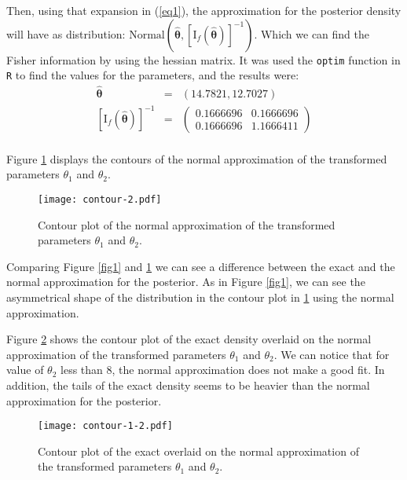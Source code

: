 \documentclass[a4paper, 11pt]{article}
\begin{document}
Then, using that expansion in (\ref{eq1}), the approximation for the posterior density will have as distribution: $\mbox{Normal} \left(\boldsymbol{\hat{\theta}}, [\mbox{I}_f(\boldsymbol{\hat{\theta}})]^{-1}  \right)$. Which we can find the Fisher information by using the hessian matrix. It was used the \texttt{optim} function in \texttt{R} to find the values for the parameters, and the results were: 
\begin{equation}
\begin{array}{rclll}
\boldsymbol{\hat{\theta}} & = & (14.7821, 12.7027) \\
\left[\mbox{I}_f(\boldsymbol{\hat{\theta}})\right]^{-1} & = & \left(
    \begin{array}{cc}
     0.1666696  & 0.1666696\\
     0.1666696  & 1.1666411 
    \end{array}
        \right) \\
\end{array}
\label{eq2}
\end{equation}

Figure \ref{fig2} displays the contours of the normal approximation of the transformed parameters $\theta_1$ and $\theta_2$. 
\begin{figure}[H]
\centering
\caption{Contour plot of the normal approximation of the transformed parameters $\theta_1$ and $\theta_2$.}
\label{fig2}
\texttt{[image: contour-2.pdf]}
\end{figure}

Comparing Figure \ref{fig1} and \ref{fig2} we can see a difference between the exact and the normal approximation for the posterior. As in Figure \ref{fig1}, we can see the asymmetrical shape of the distribution in the contour plot in \ref{fig2} using the normal approximation.

Figure \ref{fig2-1} shows the contour plot of the exact density overlaid on the normal approximation of the transformed parameters $\theta_1$ and $\theta_2$. We can notice that for value of $\theta_2$ less than 8, the normal approximation does not make a good fit. In addition, the tails of the exact density seems to be heavier than the normal approximation for the posterior.
\begin{figure}[H]
\centering
\caption{Contour plot of the exact overlaid on the normal approximation of the transformed parameters $\theta_1$ and $\theta_2$.}
\label{fig2-1}
\texttt{[image: contour-1-2.pdf]}
\end{figure}
\end{document}
